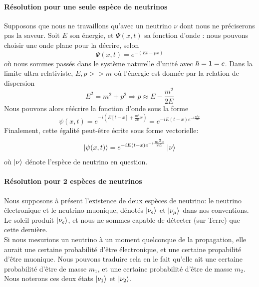 \documentclass[../notesdecours.tex]{subfiles}
\begin{document}
\paragraph{Résolution pour une seule espèce de neutrinos}

Supposons que nous ne travaillons qu'avec un neutrino $\nu$ dont nous ne préciserons pas la saveur. Soit $E$ son énergie, et $\Psi(x,t)$ sa fonction d'onde : nous pouvons choisir une onde plane pour la décrire, selon
\begin{equation}
    \Psi(x,t) = e^{-\left(Et-px\right)}
\end{equation}
où nous sommes passés dans le système naturelle d'unité avec $\hbar = 1 = c$. Dans la limite ultra-relativiste, $E,p >> m$ où l'énergie est donnée par la relation de dispersion
\begin{equation}
    E^2 = m^2 + p^2 \Rightarrow p \approx E-\frac{m^2}{2E}
\end{equation}
Nous pouvons alors réécrire la fonction d'onde sous la forme
\begin{equation*}
    \psi(x,t) = e^{-i\left(E\left[t-x\right]+\frac{m^2}{2E}x\right)} = e^{-iE\left(t-x\right)e^{-i\frac{m^2x}{2E}}}
\end{equation*}
Finalement, cette égalité peut-être écrite sous forme vectorielle:
\begin{equation}\label{eq:fonction d'onde}
    \ket{\psi(x,t)} = e^{-iE\left(t-x\right)e^{-i\frac{m^2x}{2E}}}\ket{\nu}
\end{equation}
où $\ket{\nu}$ dénote l'espèce de neutrino en question.
\paragraph{Résolution pour 2 espèces de neutrinos}
Nous supposons à présent l'existence de deux espèces de neutrino: le neutrino électronique et le neutrino muonique, dénotés $\ket{\nu_e}$ et $\ket{\nu_\mu}$ dans nos conventions. Le soleil produit $\ket{\nu_e}$, et nous ne sommes capable de détecter (sur Terre) que cette dernière.\\

Si nous mesurions un neutrino à un moment quelconque de la propagation, elle aurait une certaine probabilité d'être électronique, et une certaine propabilité d'être muonique. Nous pouvons traduire cela en le fait qu'elle ait une certaine probabilité d'être de masse $m_1$, et une certaine probabilité d'être de masse $m_2$. Nous noterons ces deux états $\ket{\nu_1}$ et $\ket{\nu_2}$.\\
\end{document}
